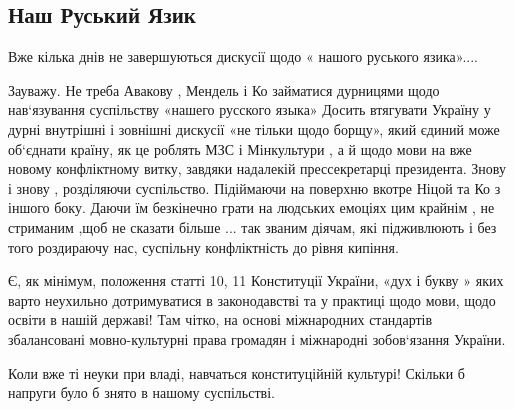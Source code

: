  
 
 
 
 

\subsection{Наш Руський Язик}
\label{sec:06_04_2021.fb.stavnijchuk_marina.1.mova_jazyk}

Вже кілька днів не завершуються дискусії щодо « нашого руського язика».... 

Зауважу.  Не треба Авакову , Мендель і Ко займатися дурницями щодо
нав‘язування суспільству «нашего русского языка» Досить втягувати Україну  у
дурні внутрішні і зовнішні дискусії «не тільки  щодо борщу», який єдиний може
об‘єднати країну, як це роблять МЗС  і Мінкультури , а й щодо мови на вже
новому конфліктному витку, завдяки надалекій прессекретарці президента.  Знову
і знову , розділяючи суспільство. Підіймаючи на поверхню  вкотре Ніцой та Ко з
іншого боку.  Даючи їм безкінечно грати на людських емоціях цим крайнім , не
стриманим ,щоб не сказати більше ... так званим діячам, які підживлюють і без
того роздираючу нас, суспільну конфліктність до рівня кипіння. 

Є, як мінімум, положення статті  10, 11 Конституції України, «дух і букву »
яких варто неухильно дотримуватися в законодавстві та у практиці щодо мови,
щодо освіти в нашій державі!  Там чітко, на основі міжнародних стандартів
збалансовані мовно-культурні права громадян і міжнародні зобов‘язання України. 

Коли вже ті неуки при владі, навчаться  конституційній культурі! Скільки б
напруги було б знято в нашому суспільстві.

